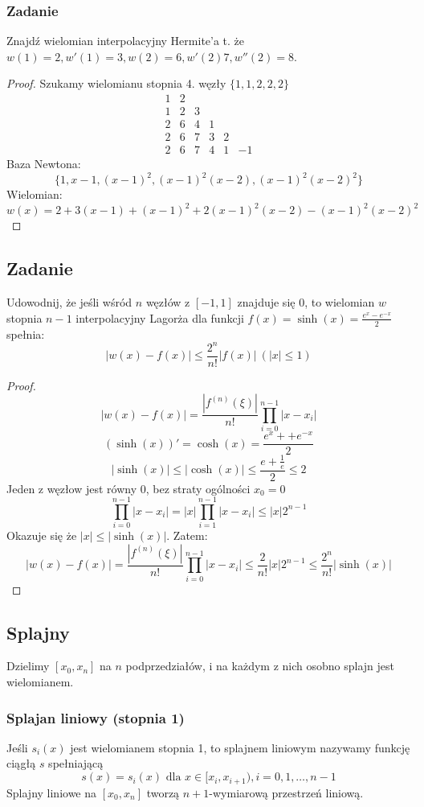 \documentclass{article}
\begin{document}
\subsubsection{Zadanie}
Znajdź wielomian interpolacyjny Hermite'a t. że $ w(1)=2, w'(1)=3, w(2)=6, w'(2)7, w''(2)=8 $.
\begin{proof}
	Szukamy wielomianu stopnia 4.
	węzły $ \{1, 1, 2, 2, 2\} $
$$	\begin{array}{c|ccccc}
1&2&&&&\\
1&2&3&&&\\
2&6&4&1&&\\
2&6&7&3&2&\\
2&6&7&4&1&-1
	\end{array}$$
Baza Newtona:
	$$\{1, x-1, (x-1)^2, (x-1)^2(x-2), (x-1)^2(x-2)^2\}$$
	Wielomian:
	$$w(x)=2+3(x-1)+(x-1)^2+2(x-1)^2(x-2)-(x-1)^2(x-2)^2$$
\end{proof}
\subsection{Zadanie}
Udowodnij, że jeśli wśród $ n $ węzłów z $[-1,1]$ znajduje się 0, to wielomian $w$ stopnia $ n-1 $ interpolacyjny Lagorża dla funkcji $ f(x)=\sinh(x)=\frac{e^x-e^{-x}}{2} $ spełnia:  $$ |w(x)-f(x)| \le \frac{2^n}{n!}|f(x)|\ (|x| \le 1)$$
\begin{proof}
$$|w(x)-f(x)|=\frac{|f^{(n)}(\xi)|}{n!}\prod_{i=0}^{n-1}|x-x_i|$$
$$(\sinh(x))'=\cosh(x)=\frac{e^x++e^{-x}}{2}$$
$$|\sinh(x)| \le |\cosh(x)| \le \frac{e+\frac1e}{2} \le 2$$
Jeden z węzłow jest równy 0, bez straty ogólności $ x_0=0 $
$$\prod_{i=0}^{n-1}|x-x_i|=|x|\prod_{i=1}^{n-1}|x-x_i| \le |x|2^{n-1}$$
Okazuje się że $ |x| \le |\sinh(x)| $. Zatem:
$$|w(x)-f(x)|=\frac{|f^{(n)}(\xi)|}{n!}\prod_{i=0}^{n-1}|x-x_i| \le \frac{2}{n!}|x|2^{n-1} \le \frac{2^n}{n!}|\sinh(x)|$$
\end{proof}
\subsection{Splajny}
Dzielimy $ [x_0,x_n] $ na $ n $ podprzedziałów, i na każdym z nich osobno splajn jest wielomianem.
\subsubsection{Splajan liniowy (stopnia 1)}
Jeśli $ s_i(x) $ jest wielomianem stopnia 1, to splajnem liniowym nazywamy funkcję ciągłą $ s $ spełniającą
$$s(x)=s_i(x)\text{ dla }x\in[x_i, x_{i+1}), i=0,1,\dots,n-1$$
Splajny liniowe na $ [x_0, x_n] $ tworzą $ n+1 $-wymiarową przestrzeń liniową.
\end{document}
